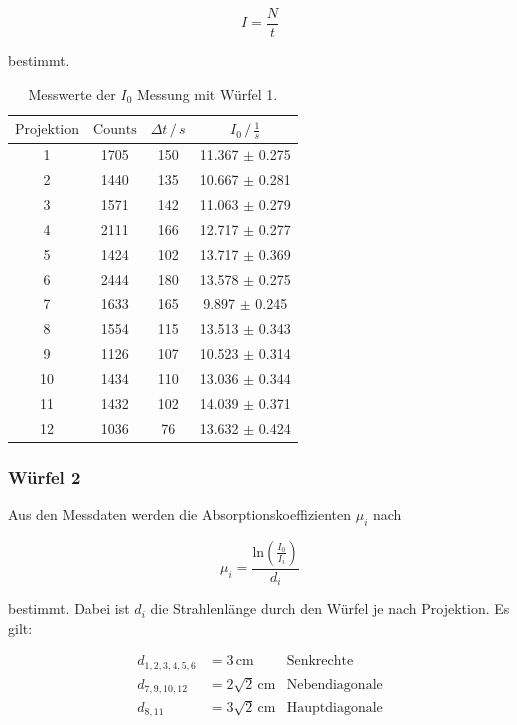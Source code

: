 \begin{equation}
  I = \frac{N}{t}
\end{equation}

\noindent
bestimmt.

\begin{table}
  \centering
  \begin{tabular}{c c c c}
  \toprule
  $\text{Projektion}$ & $\text{Counts}$ & $\Delta t \,/\, s $ & $I_0 \,/\, \frac{1}{s} $\\
  \midrule 
    1  & 1705 & 150 & 11.367 $\pm$ 0.275 \\
    2  & 1440 & 135 & 10.667 $\pm$ 0.281 \\
    3  & 1571 & 142 & 11.063 $\pm$ 0.279 \\
    4  & 2111 & 166 & 12.717 $\pm$ 0.277 \\
    5  & 1424 & 102 & 13.717 $\pm$ 0.369 \\
    6  & 2444 & 180 & 13.578 $\pm$ 0.275 \\
    7  & 1633 & 165 & 9.897  $\pm$ 0.245 \\
    8  & 1554 & 115 & 13.513 $\pm$ 0.343 \\
    9  & 1126 & 107 & 10.523 $\pm$ 0.314 \\
    10 & 1434 & 110 & 13.036 $\pm$ 0.344 \\
    11 & 1432 & 102 & 14.039 $\pm$ 0.371 \\
    12 & 1036 &  76 & 13.632 $\pm$ 0.424 \\
  \bottomrule
  \end{tabular}
  \caption{Messwerte der $I_0$ Messung mit Würfel 1.}
  \label{tab:w1}
  \end{table}




\subsubsection{Würfel 2}

\noindent
Aus den Messdaten werden die Absorptionskoeffizienten $\mu_i$ nach 

\begin{equation}
\mu_i = \frac{\text{ln}(\frac{I_0}{I_i})}{d_i}
\label{eqn:mu}
\end{equation}

\noindent
bestimmt. Dabei ist $d_i$ die Strahlenlänge durch den Würfel je nach Projektion.
Es gilt:

\begin{align*}
d_{1,2,3,4,5,6} &= 3 \, \text{cm}       &\text{Senkrechte}\\
d_{7,9,10,12} &= 2 \sqrt{2} \, \text{cm} &\text{Nebendiagonale}\\
d_{8,11} &= 3 \sqrt{2} \, \text{cm} &\text{Hauptdiagonale}
\end{align*}

